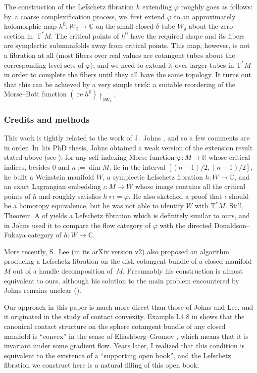 \documentclass[10pt]{amsart}
\newcommand{\C}{{\mathbb C}}
\newcommand{\R}{{\mathbb R}}
\newcommand{\re}{\operatorname{re}}
\newcommand{\sT}{\mathrm{T}^\ast}
\newcommand{\de}{\mathrel{:=}}
\newcommand{\rst}[1]{{\upharpoonright}_{\!#1}}
\let\del\partial
\let\on\colon
\theoremstyle{plain}
\theoremstyle{definition}
\begin{document}
The construction of the Lefschetz fibration $h$ extending $\varphi$ roughly goes
as follows: by~a coarse complexification process, we~first extend $\varphi$ to
an approximately holomorphic map $h^0 \on W_\delta \to \C$ on the small closed
$\delta$-tube $W_\delta$ about the zero-section in~$\sT M$. The critical points
of $h^0$ have the required shape and its fibers are symplectic submanifolds away
from critical points. This map, however, is not a fibration at all (most fibers
over real values are cotangent tubes about the corresponding level sets of
$\varphi$), and we need to extend it over larger tubes in $\sT M$ in order to
complete the fibers until they all have the same topology. It turns out that
this can be achieved by a very simple trick: a suitable reordering of the
Morse--Bott function $(\re h^0) \rst{ \del W_\delta }$.

\subsubsection*{Credits and methods}

This work is tightly related to the work of J.~Johns \cite{Jo1}, and so a few
comments are in order. In~his PhD thesis, Johns obtained a weak version of the
extension result stated above (see \cite[Th.\,A]{Jo1}): for any self-indexing
Morse function $\varphi \on M \to \R$ whose critical indices, besides $0$ and
$n \de \dim M$, lie in the interval $[(n-1)/2,(n+1)/2]$, he built a Weinstein
manifold $W$, a symplectic Lefschetz fibration $h \on W \to \C$, and an exact
Lagrangian embedding $\iota \on M \to W$ whose image contains all the critical
points of $h$ and roughly satisfies $h \circ \iota = \varphi$. He also sketched
a proof that $\iota$ should be a homotopy equivalence, but he was not able to
identify $W$ with $\sT M$. Still, Theorem~A of \cite{Jo1} yields a Lefschetz
fibration which is definitely similar to ours, and in \cite{Jo2} Johns used it
to compare the flow category of $\varphi$ with the directed Donaldson--Fukaya
category of $h \on W \to \C$.

More recently, S.~Lee \cite{Le} (in its arXiv version v2) also proposed an algorithm producing a Lefschetz
fibration on the disk cotangent bundle of a closed manifold $M$ out of a handle
decomposition of~$M$. Presumably his construction is almost equivalent to ours,
although his solution to the main problem encountered by Johns remains unclear
(\cf \cite[\S6.3 of the arXiv version v2]{Le}).

Our approach in this paper is much more direct than those of Johns and Lee, and
it originated in the study of contact convexity. Example I.4.8 in \cite{Gi}
shows that the canonical contact structure on the sphere cotangent bundle of any
closed manifold is ``convex'' in the sense of Eliashberg--Gromov \cite{EG},
which means that it is invariant under some gradient flow. Years later, I
realized that this condition is equivalent to the existence of a ``supporting
open book'', and the Lefschetz fibration we construct here is a natural filling
of this open book.
\end{document}
